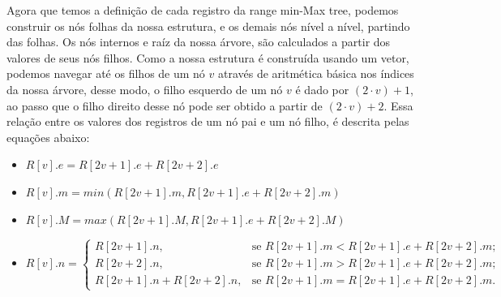     Agora que temos a definição de cada registro da range min-Max tree, podemos construir os nós folhas da nossa estrutura, e os demais nós nível a nível, partindo das folhas. Os nós internos e raíz da nossa árvore, são calculados a partir dos valores de seus nós filhos. Como a nossa estrutura é construída usando um vetor, podemos navegar até os filhos de um nó $v$ através de aritmética básica nos índices da nossa árvore, desse modo, o filho esquerdo de um nó $v$ é dado por $(2 \cdot v)+1$, ao passo que o filho direito desse nó pode ser obtido a partir de $(2 \cdot v) +2$. Essa relação entre os valores dos registros de um nó pai e um nó filho, é descrita pelas equações abaixo:

    \begin{itemize}
        \item $R[v].e = R[2v +1 ].e + R[2v + 2].e$
        \item $R[v].m = min(R[2v+1].m, R[2v+1].e + R[2v + 2].m)$
        \item $R[v].M = max(R[2v+1].M, R[2v+1].e + R[2v + 2].M)$
        \item $ R[v].n =
           \begin{cases}
                 R[2v+1].n, & \mbox{se } R[2v+1].m < R[2v+1].e + R[2v + 2].m; \\
                 R[2v + 2].n, & \mbox{se } R[2v+1].m > R[2v+1].e + R[2v + 2].m; \\
                 R[2v+1].n + R[2v + 2].n, & \mbox{se }  R[2v+1].m = R[2v+1].e + R[2v + 2].m .
           \end{cases}
        $
    \end{itemize}

